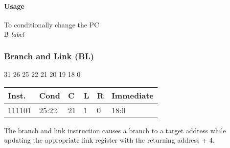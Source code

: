 \documentclass[12pt]{article}
\begin{document}
    \paragraph{Usage}
    \begin{flushleft}
    To conditionally change the PC \\
    \vspace{1em}
    B \textit{label}
    \end{flushleft}


\newpage
\subsubsection{Branch and Link (BL)}
    
    \hspace{1.6cm}31 \hspace{1.15cm}26 \hspace{.05cm}25 \hspace{.8cm}22 \hspace{.1cm}21 \hspace{.2cm}20 \hspace{.2cm}19 \hspace{.1cm}18 \hspace{6.1cm}0
    \vspace{-.25cm}
    \begin{center}
        \begin{tabular}{ |p{1.8cm}|p{1.5cm}|p{.3cm}|p{.3cm}|p{.3cm}|p{6.5cm}| }
            \hline
            \textbf{Inst.} & \textbf{Cond} &  \textbf{C} & \textbf{L}&\textbf{R}&\textbf{Immediate}\\
            \hline
            111101& 25:22 & 21 & 1 & 0 &18:0\\
            \hline
        \end{tabular}
    \end{center}
    
    \noindent
    The branch and link instruction causes a branch to a target address while updating the appropriate link register with the returning address + 4.
    
\end{document}
